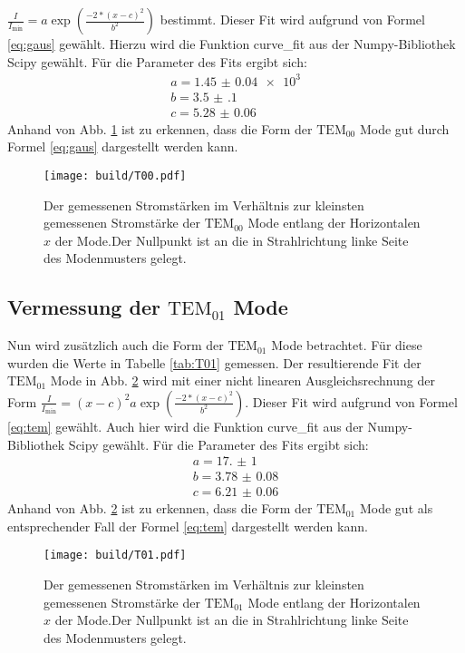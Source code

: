 	$\frac{I}{I_\text{min}} = a \exp \left( \frac{-2*(x-c)^2}{b^2}\right)$
bestimmt. Dieser Fit wird aufgrund von Formel \eqref{eq:gaus} gewählt. Hierzu wird die Funktion curve\_fit aus der Numpy-Bibliothek Scipy \cite{scipy} gewählt. Für die Parameter des Fits ergibt sich:
\begin{gather*}
a = \num{1.45(4)e3}\\
b = \num{3.5(1)}\\
c = \num{5.28(6)}
\end{gather*}
Anhand von Abb. \ref{fig:T00} ist zu erkennen, dass die Form der $\text{TEM}_\text{00}$ Mode gut durch Formel \eqref{eq:gaus} dargestellt werden kann.



\begin{figure}
	\centering
	\texttt{[image: build/T00.pdf]}
	\caption{Der gemessenen Stromstärken im Verhältnis zur kleinsten gemessenen Stromstärke der $\text{TEM}_{00}$ Mode entlang der Horizontalen $x$ der Mode.Der Nullpunkt ist an die in Strahlrichtung linke Seite des Modenmusters gelegt.}
	\label{fig:T00}
\end{figure}



\subsection{Vermessung der $\text{TEM}_{01}$ Mode}
Nun wird zusätzlich auch die Form der $\text{TEM}_\text{01}$ Mode betrachtet. Für diese wurden die Werte in Tabelle \ref{tab:T01} gemessen. 
Der resultierende Fit der $\text{TEM}_\text{01}$ Mode in Abb. \ref{fig:T01} wird mit einer nicht linearen Ausgleichsrechnung der Form $\frac{I}{I_\text{min}} =  (x-c)^2 a \exp \left( \frac{-2*(x-c)^2}{b^2}\right)$. Dieser Fit wird aufgrund von Formel \eqref{eq:tem} gewählt. Auch hier wird die Funktion curve\_fit aus der Numpy-Bibliothek Scipy \cite{scipy} gewählt. Für die Parameter des Fits ergibt sich:
\begin{gather*}
a = \num{17.(1)}\\
b = \num{3.78(8)}\\
c = \num{6.21(6)}
\end{gather*}
Anhand von Abb. \ref{fig:T01} ist zu erkennen, dass die Form der $\text{TEM}_\text{01}$ Mode gut als entsprechender Fall der Formel \eqref{eq:tem} dargestellt werden kann.

\begin{figure}
	\centering
	\texttt{[image: build/T01.pdf]}
	\caption{Der gemessenen Stromstärken im Verhältnis zur kleinsten gemessenen Stromstärke der $\text{TEM}_{01}$ Mode entlang der Horizontalen $x$ der Mode.Der Nullpunkt ist an die in Strahlrichtung linke Seite des Modenmusters gelegt.}
	\label{fig:T01}
\end{figure}



